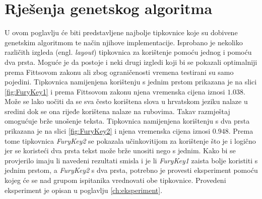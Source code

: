 \documentclass[times, utf8, zavrsni]{fer}
\begin{document}
\clearpage

\section{Rješenja genetskog algoritma}
U ovom poglavlju će biti predstavljene najbolje tipkovnice koje su dobivene genetskim algoritmom te način njihove implementacije. Isprobano je nekoliko različith izgleda (engl. \emph{layout}) tipkovnica za korištenje pomoću jednog i pomoću dva prsta. 
Moguće je da postoje i neki drugi izgledi koji bi se pokazali optimalniji prema Fittsovom zakonu ali zbog ograničenosti vremena testirani su samo pojedini. Tipkovnica namijenjena korištenju s jednim prstom prikazana je na slici \ref{fig:FuryKey1} i prema Fittsovom zakonu njena vremenska cijena iznosi $1.038$. Može se lako uočiti da se sva često korištena slova u hrvatskom jeziku nalaze u sredini dok se ona rijeđe korištena nalaze na rubovima. Takav razmještaj omogućuje brže unošenje teksta. Tipkovnica namijenjena korištenju s dva prsta prikazana je na slici \ref{fig:FuryKey2} i njena vremenska cijena iznosi $0.948$. Prema tome tipkovnica \emph{FuryKey2} se pokazala učinkovitijom za korištenje što je i logično jer se koristeći dva prsta tekst može brže unositi nego s jednim. Kako bi se provjerilo imaju li navedeni rezultati smisla i je li \emph{FuryKey1} zaista bolje koristiti s jednim prstom, a \emph{FuryKey2} s dva prsta, potrebno je provesti eksperiment pomoću kojeg će se nad grupom ispitanika vrednovati obe tipkovnice. Provedeni eksperiment je opisan u poglavlju \ref{ch:eksperiment}.
\end{document}
